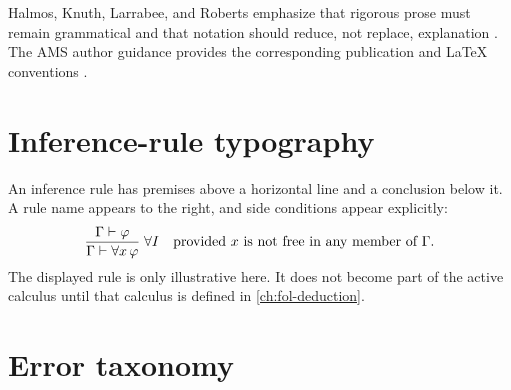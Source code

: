 \documentclass[11pt,oneside,openany]{book}
\theoremstyle{definition}
\theoremstyle{plain}
\theoremstyle{remark}
\newcommand{\derives}{\vdash}
\newcommand{\Rule}[3][]{\frac{#2}{#3}\;\textsc{#1}}
\newcommand{\side}[1]{\quad\text{#1}}
\begin{document}
Halmos, Knuth, Larrabee, and Roberts emphasize that rigorous prose must
remain grammatical and that notation should reduce, not replace, explanation
\cite{Halmos1970,KnuthLarrabeeRoberts1989}.  The AMS author guidance provides
the corresponding publication and \LaTeX{} conventions
\cite{AMSAuthorHandbook}.

\section{Inference-rule typography}
\label{sec:writing-foundations-06}

An inference rule has premises above a horizontal line and a conclusion below
it.  A rule name appears to the right, and side conditions appear explicitly:
\[
  \Rule[\(\forall I\)]{\Gamma\derives\varphi}{\Gamma\derives\forall x\,\varphi}
  \side{provided \(x\) is not free in any member of \(\Gamma\)}.
\]
The displayed rule is only illustrative here.  It does not become part of the
active calculus until that calculus is defined in \cref{ch:fol-deduction}.

\section{Error taxonomy}
\label{sec:writing-foundations-07}
\end{document}
